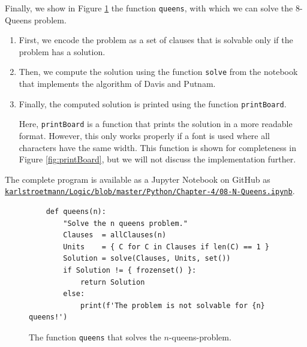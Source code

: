 Finally, we show in Figure \ref{fig:solve:queens} the function
\texttt{queens}, with which we can solve the 8-Queens problem.
\begin{enumerate}
\item First, we encode the problem as a set of clauses that is solvable
      only if the problem has a solution.
\item Then, we compute the solution using the function \texttt{solve} from the notebook
      that implements the algorithm of Davis and Putnam.
\item Finally, the computed solution is printed using the function \texttt{printBoard}.

      Here, \texttt{printBoard} is a function that prints the solution in a more readable format.
      However, this only works properly if a font is used where all characters have the same width.
      This function is shown for completeness in Figure \ref{fig:printBoard}, but we will not discuss the implementation further.
\end{enumerate}
The complete program is available as a Jupyter Notebook on GitHub as
\\[0.2cm]
\hspace*{0.0cm}
\href{https://github.com/karlstroetmann/Logic/blob/master/Python/Chapter-4/08-N-Queens.ipynb}{\texttt{karlstroetmann/Logic/blob/master/Python/Chapter-4/08-N-Queens.ipynb}}.




\begin{figure}[!ht]
\centering
\begin{verbatim}
    def queens(n):
        "Solve the n queens problem."
        Clauses  = allClauses(n)
        Units    = { C for C in Clauses if len(C) == 1 }
        Solution = solve(Clauses, Units, set())
        if Solution != { frozenset() }:
            return Solution
        else:
            print(f'The problem is not solvable for {n} queens!')
\end{verbatim}
\vspace*{-0.3cm}
\caption{The function \texttt{queens} that solves the $n$-queens-problem.}
\label{fig:solve:queens}
\end{figure}


